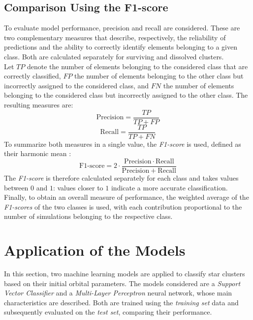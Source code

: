 \subsection{Comparison Using the F1-score}
\label{subsec:confronto-f1-score}
To evaluate model performance, precision and recall are considered. These are two complementary measures that describe, respectively, the reliability of predictions and the ability to correctly identify elements belonging to a given class. Both are calculated separately for surviving and dissolved clusters.\\ Let $TP$ denote the number of elements belonging to the considered class that are correctly classified, $FP$ the number of elements belonging to the other class but incorrectly assigned to the considered class, and $FN$ the number of elements belonging to the considered class but incorrectly assigned to the other class. The resulting measures are:
\begin{equation}
	\mathrm{Precision} = \frac{TP}{TP+FP}
	\label{eq:precisione}
\end{equation}
\begin{equation}
	\mathrm{Recall} = \frac{TP}{TP+FN}
	\label{eq:richiamo}
\end{equation}
To summarize both measures in a single value, the \emph{F1-score} is used, defined as their harmonic mean \cite{sokolova2009systematic}:
\begin{equation}
	\mathrm{F1\text{-}score} = 2 \cdot \frac{\mathrm{Precision}\cdot\mathrm{Recall}}{\mathrm{Precision}+\mathrm{Recall}}
	\label{eq:f1-score}
\end{equation}
The \emph{F1-score} is therefore calculated separately for each class and takes values between $0$ and $1$: values closer to $1$ indicate a more accurate classification. Finally, to obtain an overall measure of performance, the weighted average of the \emph{F1-scores} of the two classes is used, with each contribution proportional to the number of simulations belonging to the respective class.
\section{Application of the Models}
\label{sec:applicazione-modelli}
In this section, two machine learning models are applied to classify star clusters based on their initial orbital parameters. The models considered are a \emph{Support Vector Classifier} and a \emph{Multi-Layer Perceptron} neural network, whose main characteristics are described. Both are trained using the \emph{training set} data and subsequently evaluated on the \emph{test set}, comparing their performance.
